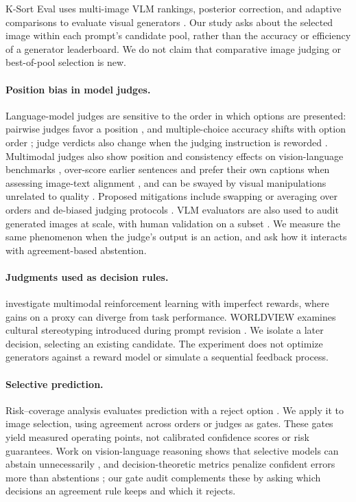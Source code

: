 \documentclass[letterpaper]{article}
\begin{document}
K-Sort Eval uses multi-image VLM rankings, posterior correction, and adaptive comparisons to evaluate visual generators \citep{ksort2026}. Our study asks about the selected image within each prompt's candidate pool, rather than the accuracy or efficiency of a generator leaderboard. We do not claim that comparative image judging or best-of-pool selection is new.

\paragraph{Position bias in model judges.}
Language-model judges are sensitive to the order in which options are presented: pairwise judges favor a position \citep{zheng2023judging,wang2024fair,shi2025judging}, and multiple-choice accuracy shifts with option order \citep{pezeshkpour2024order}; judge verdicts also change when the judging instruction is reworded \citep{bellibatlu2026judgesense}. Multimodal judges also show position and consistency effects on vision-language benchmarks \citep{chen2024mllmjudge}, over-score earlier sentences and prefer their own captions when assessing image-text alignment \citep{saito2025haldec}, and can be swayed by visual manipulations unrelated to quality \citep{hwang2025fooling}. Proposed mitigations include swapping or averaging over orders \citep{zheng2023judging,wang2024fair} and de-biased judging protocols \citep{asaria2026judging}. VLM evaluators are also used to audit generated images at scale, with human validation on a subset \citep{seo2026portrait}. We measure the same phenomenon when the judge's output is an action, and ask how it interacts with agreement-based abstention.

\paragraph{Judgments used as decision rules.}
\citet{yao2026} investigate multimodal reinforcement learning with imperfect rewards, where gains on a proxy can diverge from task performance. WORLDVIEW examines cultural stereotyping introduced during prompt revision \citep{urman2026}. We isolate a later decision, selecting an existing candidate. The experiment does not optimize generators against a reward model or simulate a sequential feedback process.

\paragraph{Selective prediction.}
Risk--coverage analysis evaluates prediction with a reject option \citep{elyaniv2010,geifman2017}. We apply it to image selection, using agreement across orders or judges as gates. These gates yield measured operating points, not calibrated confidence scores or risk guarantees. Work on vision-language reasoning shows that selective models can abstain unnecessarily \citep{srinivasan2024recoverr}, and decision-theoretic metrics penalize confident errors more than abstentions \citep{wu2026bas}; our gate audit complements these by asking which decisions an agreement rule keeps and which it rejects.
\end{document}
